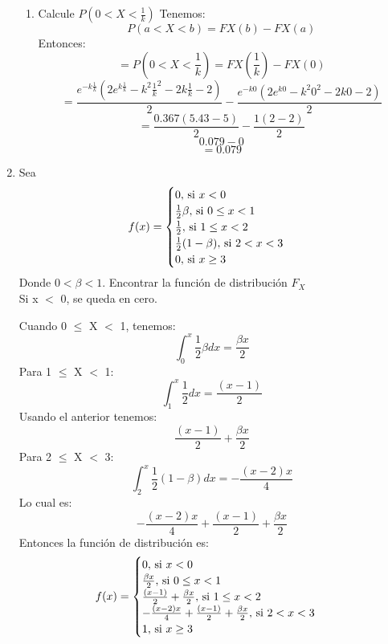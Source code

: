 \documentclass[12pt,a4paper]{report}
\begin{document}
\begin{enumerate}
{\begin{enumerate}
{				Entonces tenemos:
					\[FX(x) = \int_{0}^{x} \gamma x^2 e^{-kx} dx\]
				Pero ya tenemos que $\gamma = \frac{k^{3}}{2}$, entonces:
					\[FX(x) = \int_{0}^{x} \frac{k^{3}}{2} x^2 e^{-kx} dx\]
				Entonces calculando el integral tenemos:
					\[FX(x) =  \frac{(k^{2}x^{2} + 2kx + 2) e^{-kx}}{2}\Big|_0^x \]
				Y sustituyendo tenemos:
					\[FX(x)= \frac{e^{-kx} (2e^{kx} - k^{2} x^{2} -2kx - 2)}{2}\]
			}
			\item {
				Calcule $P(0 < X < \frac{1}{k})$
				Tenemos:
				\[ P(a < X < b) = FX(b) - FX(a)\]
				Entonces:
				\[=P(0 < X < \frac{1}{k}) = FX(\frac{1}{k}) - FX(0)\]
				\[=\frac{e^{-k\frac{1}{k}} (2e^{k\frac{1}{k}} - k^{2} \frac{1}{k}^{2} -2k\frac{1}{k} - 2)}{2} - \frac{e^{-k0} (2e^{k0} - k^{2} 0^{2} -2k0 - 2)}{2}\]
			    \[=\frac{0.367 (5.43 - 5)}{2} - \frac{1 (2 - 2)}{2}\]
				\[0.079 - 0\]
				\[=0.079 \]
			}
		\end{enumerate}
		}

		\item {
			Sea
			\[
				f(x) = \begin{cases}
								0, $ si $ x < 0\\
								\frac{1}{2}\beta, $ si $ 0 \leq x < 1\\
								\frac{1}{2}, $ si $ 1 \leq x < 2\\
								\frac{1}{2}(1-\beta), $ si $ 2 < x < 3\\
								0, $ si $ x \geq 3
						 	 \end{cases}
			\]
			Donde $0 < \beta < 1$. Encontrar la función de distribución $F_X$\\

			Si x $<$ 0, se queda en cero.

			Cuando 0 $\leq$ X $<$ 1, tenemos:
		    \[\int_{0}^{x} \frac{1}{2}\beta dx = \frac{\beta x}{2}\]
		    Para 1 $\leq$ X $<$ 1:
		    \[\int_{1}^{x} \frac{1}{2}dx = \frac{(x-1)}{2}\]
		    Usando el anterior tenemos:
		    \[\frac{(x-1)}{2} +  \frac{\beta x}{2} \]
		    Para 2 $\leq$ X $<$ 3:
		     \[\int_{2}^{x}\frac{1}{2}(1-\beta)dx = -\frac{(x-2)x}{4}\]
		     Lo cual es:
		     \[-\frac{(x-2)x}{4} + \frac{(x-1)}{2} +  \frac{\beta x}{2}\]
		     Entonces la función de distribución es:
		     	\[
				f(x) = \begin{cases}
								0, $ si $ x < 0\\
								\frac{\beta x}{2}, $ si $ 0 \leq x < 1\\
								\frac{(x-1)}{2} +  \frac{\beta x}{2}, $ si $ 1 \leq x < 2\\
								-\frac{(x-2)x}{4} + \frac{(x-1)}{2} +  \frac{\beta x}{2}, $ si $ 2 < x < 3\\
								1, $ si $ x \geq 3
						 	 \end{cases}
			\]
		}


\end{enumerate}
\end{document}

